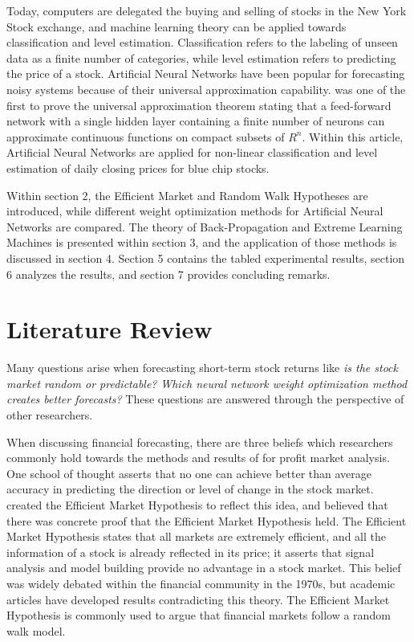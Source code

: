 \documentclass{ncjms}
\begin{document}
	Today, computers are delegated the buying and selling of stocks in the New York Stock exchange, and machine learning theory can be applied towards classification and level estimation.
	Classification refers to the labeling of unseen data as a finite number of categories, while level estimation refers to predicting the price of a stock.
	Artificial Neural Networks have been popular for forecasting noisy systems because of their universal approximation capability.
	\citet{Cybenko:1989} was one of the first to prove the universal approximation theorem stating that a feed-forward network with a single hidden layer containing a finite number of neurons can approximate continuous functions on compact subsets of $R^n$.
	Within this article, Artificial Neural Networks are applied for non-linear classification and level estimation of daily closing prices for blue chip stocks.

	Within section 2, the Efficient Market and Random Walk Hypotheses are introduced, while different weight optimization methods for Artificial Neural Networks are compared.
	The theory of Back-Propagation and Extreme Learning Machines is presented within section 3, and the application of those methods is discussed in section 4.
	Section 5 contains the tabled experimental results, section 6 analyzes the results, and section 7 provides concluding remarks.

	\section{Literature Review}\label{sec:literature-review}
	Many questions arise when forecasting short-term stock returns like
	\textit{is the stock market random or predictable?}
	\textit{Which neural network weight optimization method creates better forecasts?}
	These questions are answered through the perspective of other researchers.

	When discussing financial forecasting, there are three beliefs which researchers commonly hold towards the methods and results of for profit market analysis.
	One school of thought asserts that no one can achieve better than average accuracy in predicting the direction or level of change in the stock market.
	\citet{Fama:1970} created the Efficient Market Hypothesis to reflect this idea, and \citet{Jensen:1978} believed that there was concrete proof that the Efficient Market Hypothesis held.
	The Efficient Market Hypothesis states that all markets are extremely efficient, and all the information of a stock is already reflected in its price; it asserts that signal analysis and model building provide no advantage in a stock market.
	This belief was widely debated within the financial community in the 1970s, but academic articles have developed results contradicting this theory.
	The Efficient Market Hypothesis is commonly used to argue that financial markets follow a random walk model.
\end{document}
